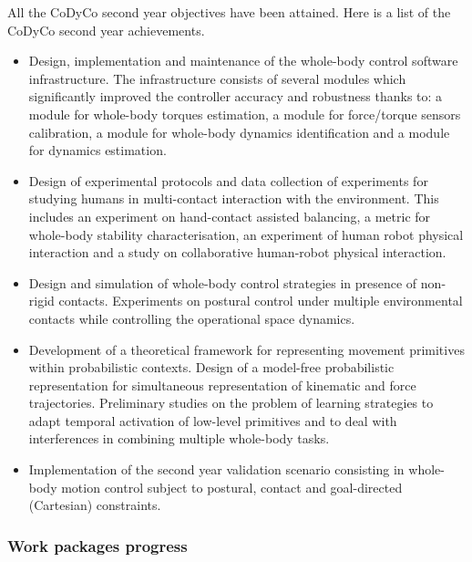 \documentclass[12pt,a4paper,twoside]{article}
\begin{document}
All the CoDyCo second year objectives have been attained. Here is a list of the CoDyCo second year achievements. 
\begin{itemize}

\item Design, implementation and maintenance of the whole-body control software infrastructure. The infrastructure consists of several modules which significantly improved the controller accuracy and robustness thanks to: a module for whole-body torques estimation, a module for force/torque sensors calibration, a module for whole-body dynamics identification and a module for dynamics estimation. 

\item Design of experimental protocols and data collection of experiments for studying humans in multi-contact interaction with the environment. This includes an experiment on hand-contact assisted balancing, a metric for whole-body stability characterisation, an experiment of human robot physical interaction and a study on collaborative human-robot physical interaction.

\item Design and simulation of whole-body control strategies in presence of non-rigid contacts. Experiments on postural control under multiple environmental contacts while controlling the operational space dynamics. 

\item Development of a theoretical framework for representing movement primitives within probabilistic contexts. Design of a model-free probabilistic representation for simultaneous representation of kinematic and force trajectories. Preliminary studies on the problem of learning strategies to adapt temporal activation of low-level primitives and to deal with interferences in combining multiple whole-body tasks. 

\item Implementation of the second year validation scenario consisting in whole-body motion control subject to postural, contact and goal-directed (Cartesian) constraints.

\end{itemize}

\subsubsection{Work packages progress}








\end{document}
